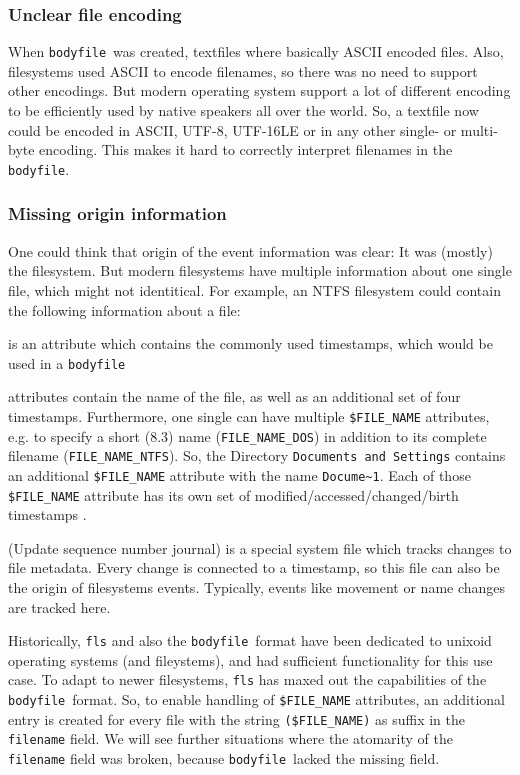 \documentclass[twocolumn]{article}
\newcommand{\bodyfile}{\texttt{bodyfile}}
\begin{document}
\subsubsection{Unclear file encoding}

When \bodyfile\ was created, textfiles where basically ASCII encoded files. Also, filesystems used ASCII to encode filenames, so there was no need to support other encodings. But modern operating system support a lot of different encoding to be efficiently used by native speakers all over the world. So, a textfile now could be encoded in ASCII, UTF-8, UTF-16LE or in any other single- or multi-byte encoding. This makes it hard to correctly interpret filenames in the \bodyfile.

\subsubsection{Missing origin information}

One could think that origin of the event information was clear: It was (mostly) the filesystem. But modern filesystems have multiple information about one single file, which might not identitical. For example, an NTFS filesystem could contain the following information about a file:

\begin{description}[font=\ttfamily]
    \item[\$STANDARD\_INFORMATION] is an attribute which contains the commonly used timestamps, which would be used in a \bodyfile
    \item[\$FILE\_NAME] attributes contain the name of the file, as well as an additional set of four timestamps. Furthermore, one single can have multiple \texttt{\$FILE\_NAME} attributes, e.g. to specify a short (8.3) name (\texttt{FILE\_NAME\_DOS}) in addition to its complete filename (\texttt{FILE\_NAME\_NTFS}). So, the Directory \texttt{Documents and Settings} contains an additional \texttt{\$FILE\_NAME} attribute with the name \texttt{Docume\~{}1}. Each of those \texttt{\$FILE\_NAME} attribute has its own set of modified/accessed/changed/birth timestamps \citep[p.308-309]{carrier2005file}.
    \item[\$UsnJrnl] (Update sequence number journal) is a special system file which tracks changes to file metadata. Every change is connected to a timestamp, so this file can also be the origin of filesystems events. Typically, events like movement or name changes are tracked here.
\end{description}

Historically, \texttt{fls} and also the \bodyfile\ format have been dedicated to unixoid operating systems (and fileystems), and had sufficient functionality for this use case. To adapt to newer filesystems, \texttt{fls} has maxed out the capabilities of the \bodyfile\ format. So, to enable handling of \texttt{\$FILE\_NAME} attributes, an additional entry is created for every file with the string \lstinline[style=inline]!($FILE_NAME)! as suffix in the \texttt{filename} field. We will see further situations where the atomarity of the \texttt{filename} field was broken, because \bodyfile\ lacked the missing field.



\end{document}
